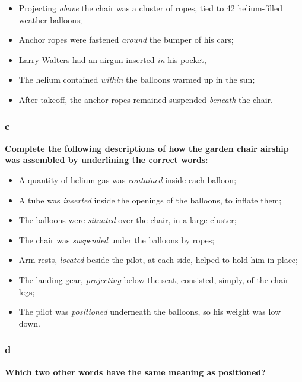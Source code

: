 \begin{itemize}

\item Projecting \textit{above} the chair was a cluster of ropes, tied to 42 helium-filled weather balloons;
\item Anchor ropes were fastened \textit{around} the bumper of his cars;
\item Larry Walters had an airgun inserted \textit{in} his pocket,
\item The helium contained \textit{within} the balloons warmed up in the sun;
\item After takeoff, the anchor ropes remained suspended \textit{beneath} the chair.

\end{itemize}

\subsubsection{c}

\textbf{Complete the following descriptions of how the garden chair airship was assembled by underlining the correct words}:

\begin{itemize}

\item A quantity of helium gas was \textit{contained} inside each balloon;
\item A tube was \textit{inserted} inside the openings of the balloons, to inflate them;
\item The balloons were \textit{situated} over the chair, in a large cluster;
\item The chair was \textit{suspended} under the balloons by ropes;
\item Arm rests, \textit{located} beside the pilot, at each side, helped to hold him in place;
\item The landing gear, \textit{projecting} below the seat, consisted, simply, of the chair legs;
\item The pilot was \textit{positioned} underneath the balloons, so his weight was low down.

\end{itemize}

\subsubsection{d}

\textbf{Which two other words have the same meaning as positioned?}

